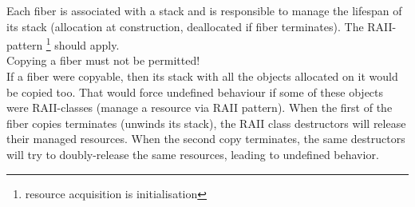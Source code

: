 \label{stackmgmt}

Each fiber is associated with a stack and is responsible to manage the lifespan
of its stack (allocation at construction, deallocated if fiber terminates). The
RAII-pattern \footnote{resource acquisition is initialisation} should apply.\\

Copying a fiber must not be permitted!\\
If a fiber were copyable, then its stack with all the objects allocated on it
would be copied too. That would force undefined behaviour if some of these
objects were RAII-classes (manage a resource via RAII pattern). When the first
of the fiber copies terminates (unwinds its stack), the RAII class destructors
will release their managed resources. When the second copy terminates, the same
destructors will try to doubly-release the same resources, leading to undefined
behavior.\\

